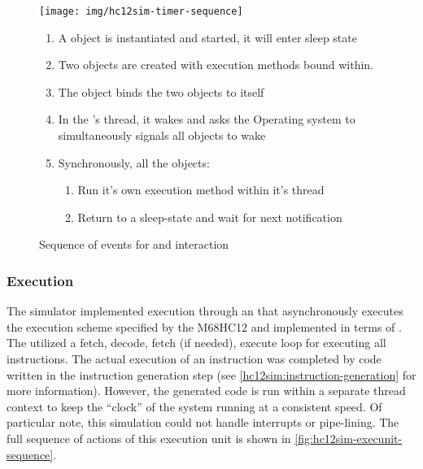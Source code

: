 \begin{figure}[!hp]
    \begin{minipage}{.5\linewidth}
        \centering
        \texttt{[image: img/hc12sim-timer-sequence]} 
    \end{minipage}%
    \begin{minipage}{.5\linewidth}
        \begin{enumerate}
            \item A  object is instantiated and started, it will enter sleep state
            \item Two  objects are created with execution methods bound within.
            \item The  object binds the two  objects to itself
            \item In the 's thread, it wakes and asks the Operating system to simultaneously signals all  objects to wake
            \item Synchronously, all the  objects:
            \begin{enumerate}
                \item Run it's own execution method within it's thread
                \item Return to a sleep-state and wait for next notification
            \end{enumerate}
        \end{enumerate}
    \end{minipage}
    \caption{Sequence of events for  and  interaction\cite{Brightwell2013}} 
    \label{fig:hc12sim-timer-seq}
\end{figure}

\subsubsection*{Execution}

The simulator implemented execution through an  that asynchronously executes the execution scheme specified by the M68HC12\cite[Sec.~4,~p.~47]{hc12Manual2006} and implemented in terms of \cite[p.~59]{Vahid2002}. The  utilized a fetch, decode, fetch (if needed), execute loop for executing all instructions. The actual execution of an instruction was completed by code written in the instruction generation step (see \cref{hc12sim:instruction-generation} for more information). However, the generated code is run within a separate thread context to keep the ``clock'' of the system running at a consistent speed. Of particular note, this simulation could not handle interrupts or pipe-lining. The full sequence of actions of this execution unit is shown in \cref{fig:hc12sim-execunit-sequence}.

